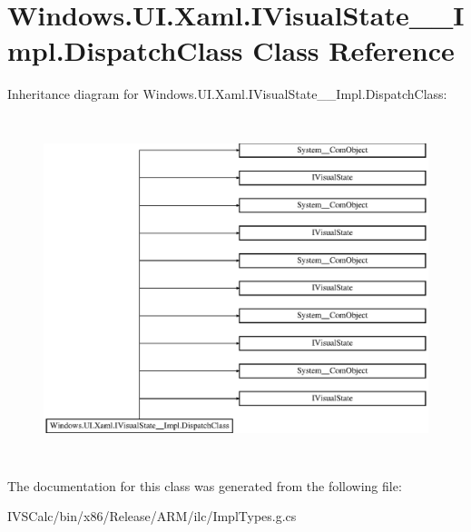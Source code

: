 \hypertarget{class_windows_1_1_u_i_1_1_xaml_1_1_i_visual_state_____impl_1_1_dispatch_class}{}\section{Windows.\+U\+I.\+Xaml.\+I\+Visual\+State\+\_\+\+\_\+\+Impl.\+Dispatch\+Class Class Reference}
\label{class_windows_1_1_u_i_1_1_xaml_1_1_i_visual_state_____impl_1_1_dispatch_class}
Inheritance diagram for Windows.\+U\+I.\+Xaml.\+I\+Visual\+State\+\_\+\+\_\+\+Impl.\+Dispatch\+Class\+:\begin{figure}[H]
\begin{center}
\leavevmode
\includegraphics[height=10.032573cm]{class_windows_1_1_u_i_1_1_xaml_1_1_i_visual_state_____impl_1_1_dispatch_class}
\end{center}
\end{figure}


The documentation for this class was generated from the following file\+:\begin{DoxyCompactItemize}
\item 
I\+V\+S\+Calc/bin/x86/\+Release/\+A\+R\+M/ilc/Impl\+Types.\+g.\+cs\end{DoxyCompactItemize}

